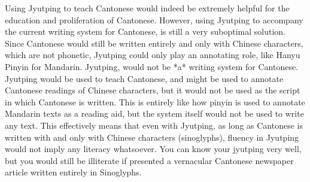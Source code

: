 \documentclass[a5paper, 10pt, openany]{book} %
\makeatletter
\renewcommand\chapter{\if@openright\cleardoublepage\else\clearpage\fi
  \thispagestyle{plain}%
  \global\@topnum\z@
  \@afterindentfalse
  \secdef\@chapter\@schapter}
\makeatother
\begin{document}










Using Jyutping to teach Cantonese would indeed be extremely helpful for the education and proliferation of Cantonese. However, using Jyutping to accompany the current writing system for Cantonese, is still a very suboptimal solution. Since Cantonese would still be written entirely and only with Chinese characters, which are not phonetic, Jyutping could only play an annotating role, like Hanyu Pinyin for Mandarin. Jyutping, would not be *a* writing system for Cantonese. Jyutping would be used to teach Cantonese, and might be used to annotate Cantonese readings of Chinese characters, but it would not be used as the script in which Cantonese is written. This is entirely like how pinyin is used to annotate Mandarin texts as a reading aid, but the system itself would not be used to write any text. This effectively means that even with Jyutping, as long as Cantonese is written with and only with Chinese characters (sinoglyphs), fluency in Jyutping would not imply any literacy whatsoever. You can know your jyutping very well, but you would still be illiterate if presented a vernacular Cantonese newspaper article written entirely in Sinoglyphs.
\end{document}
